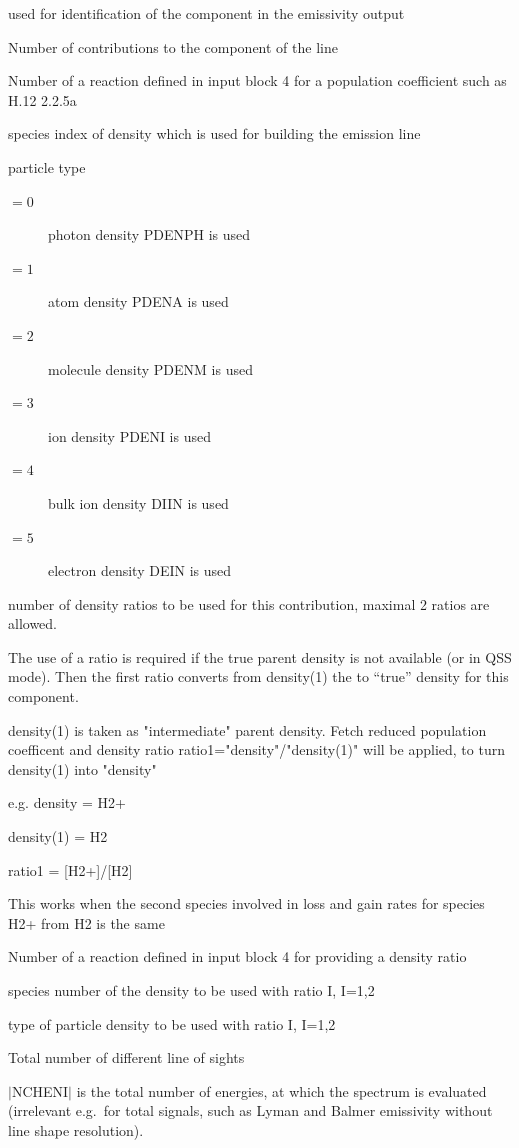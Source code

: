 \begin{description}
         used for identification of the component in the emissivity output
   \item[NUM\_CONTRIB] Number of contributions to the component of the line
   \item[IRC] Number of a reaction defined in input block 4 for a
         population coefficient such as H.12 2.2.5a
   \item[ISP] species index of density which is used for building the
         emission line
   \item[ITP] particle type
        \begin{description}
          \item[$= 0$] photon density PDENPH is used
          \item[$= 1$] atom density PDENA is used
          \item[$= 2$] molecule density PDENM is used
          \item[$= 3$] ion density PDENI is used
          \item[$= 4$] bulk ion density DIIN is used
          \item[$= 5$] electron density DEIN is used
        \end{description}
   \item[IRATIO] number of density ratios to be used for this contribution,
         maximal 2 ratios are allowed.

         The use of a ratio is required if the true parent density is not
         available (or in QSS mode). Then the first ratio converts from
         density(1) the to ``true'' density for this component.

         density(1) is taken as "intermediate" parent density. Fetch
         reduced population coefficent and density ratio
         ratio1="density"/"density(1)" will be applied,
         to turn density(1) into "density"

         e.g. density    = H2+

         \hspace{0.6 true cm} density(1) = H2

         \hspace{0.6 true cm} ratio1     = [H2+]/[H2]

         This works when the second species involved in loss and gain rates
         for species H2+ from H2 is the same
   \item[IRC\_RAT] Number of a reaction defined in input block 4 for providing
         a density ratio
   \item[ISP\_RAT] species number of the density to be used with ratio I, I=1,2
   \item[ITP\_RAT] type of particle density to be used with ratio I, I=1,2
   \item[NCHORI] Total number of different line of sights
   \item[NCHENI] $\mid$NCHENI$\mid$ is the total number of energies, at which the
        spectrum is evaluated (irrelevant e.g.\ for total signals, such as Lyman and
        Balmer emissivity without line shape resolution).


\end{description}
